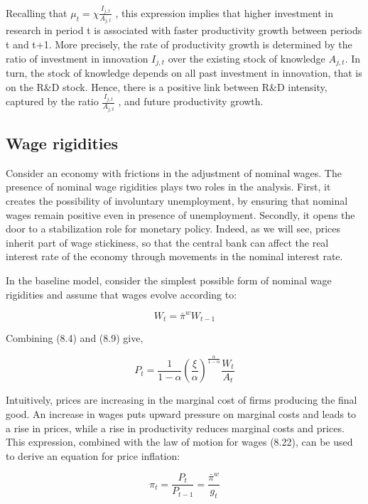 \documentclass[10pt,math=newtx,citestyle=gb7714-2015,bibstyle=gb7714-2015]{elegantbook}
\begin{document}
{{{Recalling that $\mu_t =\chi \frac{I_{j,t}}{A_{j,t}}$ , this expression implies that higher investment in research in period t is associated with faster productivity growth between periods t and t+1. More precisely, the rate of productivity growth is determined by the ratio of investment in innovation $I_{j,t}$ over the existing stock of knowledge $A_{j,t} $. In turn, the stock of knowledge depends on all past investment in innovation, that is on the R\&D stock. Hence, there is a positive link between R\&D intensity, captured by the ratio $\frac{I_{j,t}}{A_{j,t}}$ , and future productivity growth.
	
	\subsection{Wage rigidities}
	
 Consider an economy with frictions in the adjustment of nominal wages. The presence of nominal wage rigidities plays two roles in the analysis. First, it creates the possibility of involuntary unemployment, by ensuring that nominal wages remain positive even in presence of unemployment. Secondly, it opens the door to a stabilization role for monetary policy. Indeed, as we will see, prices inherit part of wage stickiness, so that the central bank can affect the real interest rate of the economy through movements in the nominal interest rate.
	
	In the baseline model, consider the simplest possible form of nominal wage rigidities and assume that wages evolve according to:
	
	\begin{equation}
		W_t = \bar{\pi}^w W_{t-1}
	\end{equation}

Combining (8.4) and (8.9) give, 

\begin{equation}
	P_t = \frac{1}{1-\alpha}\left(\frac{\xi}{\alpha}\right)^{\frac{\alpha}{1-\alpha}}\frac{W_t}{A_t}
\end{equation}
	
Intuitively, prices are increasing in the marginal cost of firms producing the final good. An increase in wages puts upward pressure on marginal costs and leads to a rise in prices, while a rise in productivity reduces marginal costs and prices. This expression, combined with the law of motion for wages (8.22), can be used to derive an equation for price inflation:	
	
	\begin{equation}
		\pi_t = \frac{P_t}{P_{t-1}} = \frac{\bar{\pi}^w}{g_t}
	\end{equation}
	
}}}
\end{document}
